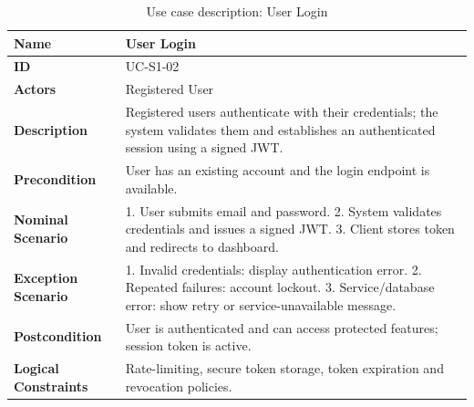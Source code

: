 \begin{table}[H]
    \centering
    \caption{Use case description: User Login}
    \label{tab:login-usecase}
    \renewcommand{\arraystretch}{1.4}
    \small
    \begin{tabularx}{\textwidth}{|p{2.5cm}|X|}
        \hline
        \textbf{Name} & User Login \\\hline
        \textbf{ID} & UC-S1-02 \\\hline
        \textbf{Actors} & Registered User \\\hline
        \textbf{Description} & Registered users authenticate with their credentials; the system validates them and establishes an authenticated session using a signed JWT. \\\hline
        \textbf{Precondition} & User has an existing account and the login endpoint is available. \\\hline
        \textbf{Nominal Scenario} & 1. User submits email and password. 2. System validates credentials and issues a signed JWT. 3. Client stores token and redirects to dashboard. \\\hline
        \textbf{Exception Scenario} & 1. Invalid credentials: display authentication error. 2. Repeated failures: account lockout. 3. Service/database error: show retry or service-unavailable message. \\\hline
        \textbf{Postcondition} & User is authenticated and can access protected features; session token is active. \\\hline
        \textbf{Logical Constraints} & Rate-limiting, secure token storage, token expiration and revocation policies. \\\hline
    \end{tabularx}
\end{table}

